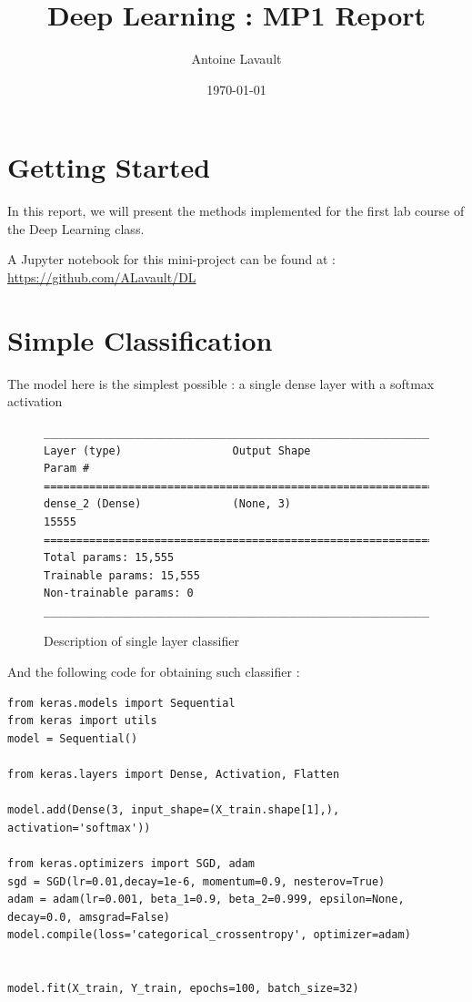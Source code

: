 \documentclass[]{article}
\title{Deep Learning : MP1 Report}
\author{Antoine Lavault}
\date{\today}
\begin{document}
\maketitle

\section*{Getting Started}

In this report, we will present the methods implemented for the first lab course of the Deep Learning class.

A Jupyter notebook for this mini-project can be found at : \href{https://github.com/ALavault/DL}{https://github.com/ALavault/DL}


\section{Simple Classification}

The model here is the simplest possible : a single dense layer with a softmax activation 
\begin{figure}[h!]
\begin{verbatim}
_________________________________________________________________
Layer (type)                 Output Shape              Param #   
=================================================================
dense_2 (Dense)              (None, 3)                 15555     
=================================================================
Total params: 15,555
Trainable params: 15,555
Non-trainable params: 0
_________________________________________________________________

\end{verbatim}
\caption{Description of single layer classifier}
\end{figure}

And the following code for obtaining such classifier :


\begin{verbatim}
from keras.models import Sequential 
from keras import utils
model = Sequential()

from keras.layers import Dense, Activation, Flatten

model.add(Dense(3, input_shape=(X_train.shape[1],), activation='softmax'))

from keras.optimizers import SGD, adam
sgd = SGD(lr=0.01,decay=1e-6, momentum=0.9, nesterov=True) 
adam = adam(lr=0.001, beta_1=0.9, beta_2=0.999, epsilon=None, decay=0.0, amsgrad=False)
model.compile(loss='categorical_crossentropy', optimizer=adam)


model.fit(X_train, Y_train, epochs=100, batch_size=32)
\end{verbatim}
\end{document}
